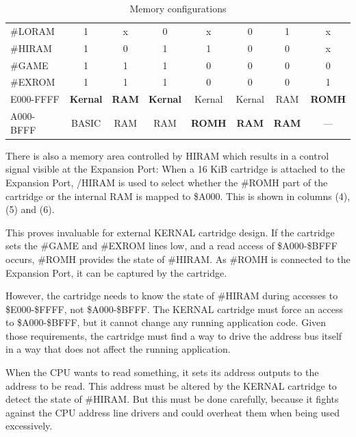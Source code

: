 \documentclass[a4paper]{memoir}
\begin{document}
\begin{table}
    \centering
    \begin{tabularx}{\textwidth}{lccccccc}

        \toprule
        \#LORAM & 1 & x & 0 & x & 0 & 1 & x \\[3pt]
        \#HIRAM & 1 & 0 & 1 & 1 & 0 & 0 & x \\[3pt]
        \#GAME  & 1 & 1 & 1 & 0 & 0 & 0 & 0 \\[3pt]
        \#EXROM & 1 & 1 & 1 & 0 & 0 & 0 & 1 \\[3pt]
        \midrule
        E000-FFFF & \textbf{Kernal} & \textbf{RAM} & \textbf{Kernal} &
          Kernal         & Kernal        & RAM           & \textbf{ROMH} \\[3pt]
        A000-BFFF & BASIC            & RAM           & RAM              &
          \textbf{ROMH} & \textbf{RAM} & \textbf{RAM} & --- \\[3pt]
        \bottomrule
    \end{tabularx}
    \caption{Memory configurations}
    \label{tab:mem-configs}
\end{table}

There is also a memory area controlled by HIRAM which results in a
control signal visible at the Expansion Port: When a 16 KiB
cartridge is attached to the Expansion Port, /HIRAM is used to
select whether the \#ROMH part of the cartridge or the internal RAM
is mapped to \$A000. This is shown in columns (4), (5) and (6).

This proves invaluable for external KERNAL cartridge design. If the
cartridge sets the \#GAME and \#EXROM lines low, and a read
access of \$A000-\$BFFF occurs, \#ROMH provides the state of
\#HIRAM. As \#ROMH is connected to the Expansion Port, it can be
captured by the cartridge.

However, the cartridge needs to know the state of \#HIRAM during 
accesses to \$E000-\$FFFF, not \$A000-\$BFFF. The KERNAL
cartridge must force an access to \$A000-\$BFFF, but it cannot
change any running application code. Given those requirements, the
cartridge must find a way to drive the address bus itself in a way
that does not affect the running application.

When the CPU wants to read something, it sets its address outputs to
the address to be read. This address must be altered by the KERNAL 
cartridge to detect the state of \#HIRAM. But this must be done 
carefully, because it fights against the CPU address
line drivers and could overheat them when being used excessively.
\end{document}
